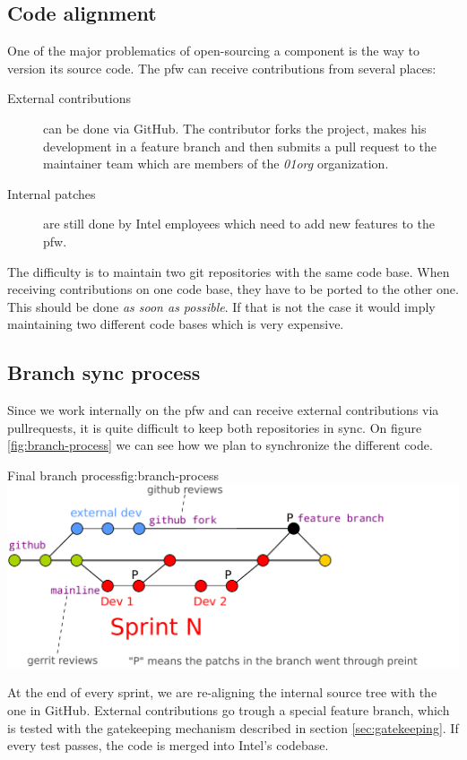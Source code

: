 \subsection{Code alignment}
One of the major problematics of open-sourcing a component is the way to version its source code.
The \gls{pfw} can receive contributions from several places:
\begin{description}
    \item[External contributions] can be done via \gls{GitHub}. The contributor forks the project, makes his development in a feature
        branch and then submits a pull request to the maintainer team which are members of the \emph{01org} organization.
    \item[Internal patches] are still done by Intel employees which need to add new features to the \gls{pfw}.
\end{description}
The difficulty is to maintain two \gls{git} repositories with the same code base. When receiving contributions on one code base, they
have to be ported to the other one. This should be done \emph{as soon as possible}. If that is not the case it would imply maintaining two different
code bases which is very expensive.

\subsection{Branch sync process}\label{sec:syncProcess}
Since we work internally on the \gls{pfw} and can receive external contributions via \gls{pullrequests},
it is quite difficult to keep both repositories in sync.
On figure \ref{fig:branch-process} we can see how we plan to synchronize the different code.

\begin{figureGraphics}{Final branch process}{fig:branch-process}
    \includegraphics[width=\textwidth]{./src/img/branches-process.pdf}
\end{figureGraphics}
At the end of every sprint, we are re-aligning the internal source tree with the one in \gls{GitHub}.
External contributions go trough a special feature branch, which is tested with the gatekeeping mechanism described in section \ref{sec:gatekeeping}.
If every test passes, the code is merged into Intel's codebase.

